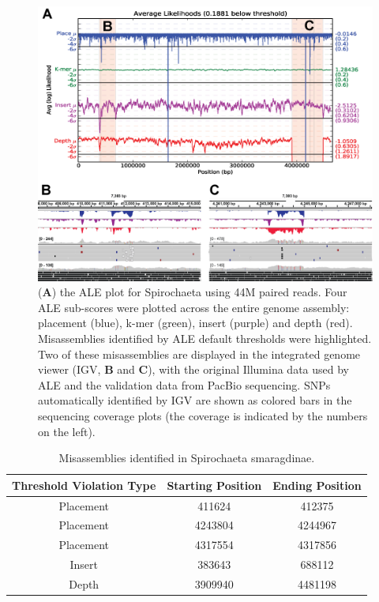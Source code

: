 \documentclass[phd,tocprelim]{cornell}
\begin{document}
\begin{figure}[!tpb]%
    \centerline{\includegraphics[width=\textwidth]{figures/ALE/Clark_Fig5c.png}}
    \caption[ALE performance on real reads]{({\bf A}) the ALE plot for Spirochaeta using 44M paired reads. Four ALE sub-scores were plotted across the entire genome assembly: placement (blue), k-mer (green), insert (purple) and depth (red). Misassemblies identified by ALE default thresholds were highlighted. Two of these misassemblies are displayed in the integrated genome viewer (IGV, {\bf B} and {\bf C}), with the original Illumina data used by ALE and the validation data from PacBio sequencing. SNPs automatically identified by IGV are shown as colored bars in the sequencing coverage plots (the coverage is indicated by the numbers on the left).}\label{ALEfig5}
\end{figure}

\begin{table}[!htp]
    \caption{Misassemblies identified in Spirochaeta smaragdinae.}
    \label{ALEtab1}
    \begin{center}
\begin{tabular}{c|c|c}
Threshold Violation Type & Starting Position & Ending Position\\\hline
Placement & 411624 & 412375\\
Placement & 4243804 & 4244967\\
Placement & 4317554 & 4317856\\
Insert & 383643 & 688112\\
Depth & 3909940 & 4481198\\
\end{tabular}
\end{center}
\end{table}
\end{document}

